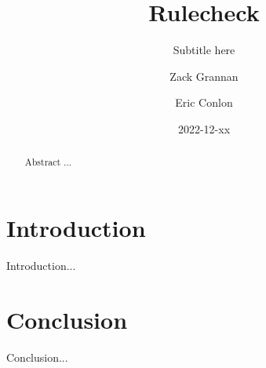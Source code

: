 \documentclass[format=acmsmall, nonacm=true, review=true, screen=true]{acmart}
\title{Rulecheck}
\subtitle{Subtitle here}
\author{Zack Grannan}
\author{Eric Conlon}
\date{2022-12-xx}
\begin{document}
\begin{abstract}

Abstract ...

\end{abstract}

\maketitle

\section{Introduction}

Introduction...

\section{Conclusion}

Conclusion...



\end{document}
